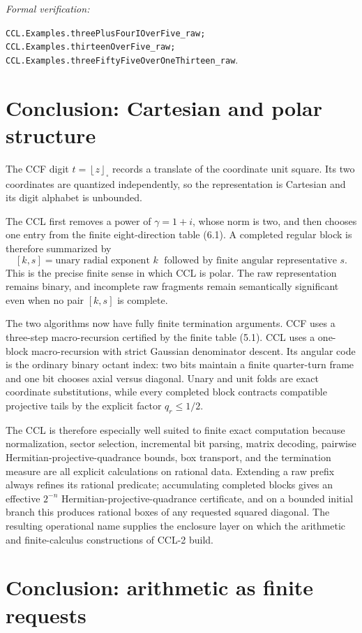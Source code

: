 \documentclass[10pt]{article}
\theoremstyle{definition}
\theoremstyle{remark}
\newcommand{\sqfloor}[1]{\left\lfloor #1\right\rfloor_{\!\square}}
\newcommand{\leanref}[1]{\par\smallskip\noindent
  \emph{Formal verification:}\par\nobreak
  {\raggedright\nolinkurl{#1}.\par}}
\begin{document}
\leanref{CCL.Examples.threePlusFourIOverFive_raw;
CCL.Examples.thirteenOverFive_raw;
CCL.Examples.threeFiftyFiveOverOneThirteen_raw}

\section{Conclusion: Cartesian and polar structure}

The CCF digit $t=\sqfloor z$ records a translate of the coordinate unit square.  Its two coordinates are quantized independently, so the representation is Cartesian and its digit alphabet is unbounded.

The CCL first removes a power of $\gamma=1+i$, whose norm is two, and then chooses one entry from the finite eight-direction table (6.1).  A completed regular block is therefore summarized by
\[
 [k,s]=\text{unary radial exponent }k\;\text{ followed by finite angular representative }s.
\]
This is the precise finite sense in which CCL is polar.  The raw representation remains binary, and incomplete raw fragments remain semantically significant even when no pair $[k,s]$ is complete.

The two algorithms now have fully finite termination arguments.  CCF uses a three-step macro-recursion certified by the finite table (5.1).  CCL uses a one-block macro-recursion with strict Gaussian denominator descent.  Its angular code is the ordinary binary octant index: two bits maintain a finite quarter-turn frame and one bit chooses axial versus diagonal.  Unary and unit folds are exact coordinate substitutions, while every completed block contracts compatible projective tails by the explicit factor $q_r\le1/2$.

The CCL is therefore especially well suited to finite exact computation because normalization, sector selection, incremental bit parsing, matrix decoding, pairwise Hermitian-projective-quadrance bounds, box transport, and the termination measure are all explicit calculations on rational data.  Extending a raw prefix always refines its rational predicate; accumulating completed blocks gives an effective $2^{-n}$ Hermitian-projective-quadrance certificate, and on a bounded initial branch this produces rational boxes of any requested squared diagonal.  The resulting operational name supplies the enclosure layer on which the arithmetic and finite-calculus constructions of CCL-2 build.

\fi

\ifCCLtwo
\section{Conclusion: arithmetic as finite requests}
\end{document}
